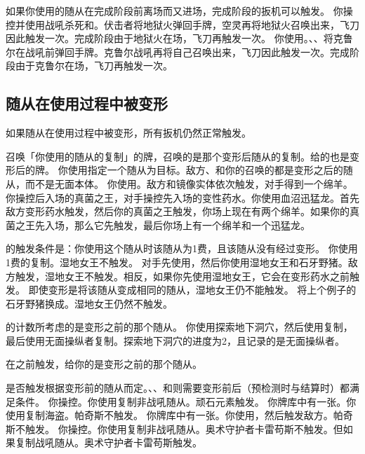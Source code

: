 如果你使用的随从在完成阶段前离场而又进场，完成阶段的扳机可以触发。
\example 你操控并使用战吼杀死和。伏击者将地狱火弹回手牌，空灵再将地狱火召唤出来，飞刀因此触发一次。完成阶段由于地狱火在场，飞刀再触发一次。
\example 你使用。、、将克鲁尔在战吼前弹回手牌。克鲁尔战吼再将自己召唤出来，飞刀因此触发一次。完成阶段由于克鲁尔在场，飞刀再触发一次。

\subsection{随从在使用过程中被变形}

如果随从在使用过程中被变形，所有扳机仍然正常触发。

召唤「你使用的随从的复制」的牌，召唤的是那个变形后随从的复制。给的也是变形后的牌。
\example 你使用指定一个随从为目标。敌方、和你的召唤的都是变形之后的随从，而不是无面本体。
\example 你使用。敌方和镜像实体依次触发，对手得到一个绵羊。
\example 你操控后入场的真菌之王，对手操控先入场的变性药水。你使用血沼迅猛龙。首先敌方变形药水触发，然后你的真菌之王触发，你场上现在有两个绵羊。如果你的真菌之王先入场，那么它先触发，最后你场上有一个绵羊和一个迅猛龙。

的触发条件是：你使用这个随从时该随从为1费，且该随从没有经过变形。
\example 你使用1费的复制。湿地女王不触发。
\example 对手先使用，然后你使用湿地女王和石牙野猪。敌方触发，湿地女王不触发。相反，如果你先使用湿地女王，它会在变形药水之前触发。
\notice 即使变形是将该随从变成相同的随从，湿地女王仍不能触发。
\example 将上个例子的石牙野猪换成。湿地女王仍然不触发。

的计数所考虑的是变形之前的那个随从。
\example 你使用探索地下洞穴，然后使用复制，最后使用无面操纵者复制。探索地下洞穴的进度为2，且记录的是无面操纵者。

在之前触发，给你的是变形之前的那个随从。

是否触发根据变形前的随从而定。、、和则需要变形前后（预检测时与结算时）都满足条件。
\example 你操控。你使用复制非战吼随从。顽石元素触发。
\example 你牌库中有一张。你使用复制海盗。帕奇斯不触发。
\example 你牌库中有一张。你使用，然后触发敌方。帕奇斯不触发。
\example 你操控。你使用复制非战吼随从。奥术守护者卡雷苟斯不触发。但如果复制战吼随从。奥术守护者卡雷苟斯触发。


